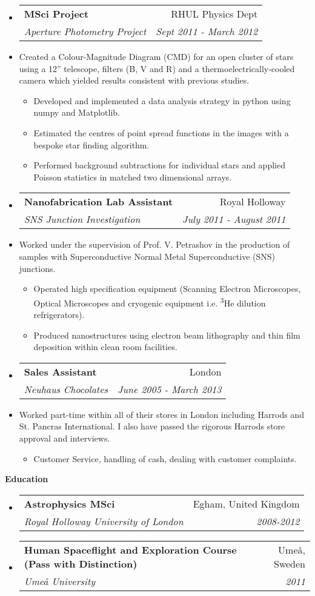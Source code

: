 \documentclass[letterpaper,11pt]{article}
\makeatletter
\newcommand{\resitem}[1]{\item #1 \vspace{-2pt}}
\newcommand{\resheading}[1]{{\large \colorbox{mygrey}
                            {\begin{minipage}{\textwidth}
                            {\textbf{#1 \vphantom{p\^{E}}}}
                            \end{minipage}}}
}
\newcommand{\ressubheading}[4]{
                \begin{tabular*}{180mm}{l@{\extracolsep{\fill}}r}
                \textbf{#1} & #2 \\
                \textit{#3} & \textit{#4} \\
                \end{tabular*}\vspace{-6pt}
}
\newcommand{\resdescription}[1]{#1 \vspace{-0mm}}
\makeatother
\begin{document}
\begin{itemize}
  \item[]
  \ressubheading{MSci Project}{RHUL Physics Dept}{Aperture Photometry Project}{Sept 2011 - March 2012}
  \item[]
    \resdescription{Created a Colour-Magnitude Diagram (CMD) for an open cluster of stars using a 12'' telescope, filters (B, V and R) and a thermoelectrically-cooled camera which yielded results consistent with previous studies.}
    \begin{itemize}
      \resitem{Developed and implemented a data analysis strategy in python using numpy and Matplotlib.}
      \resitem{Estimated the centres of point spread functions in the images with a bespoke star finding algorithm.}
      \resitem{Performed background subtractions for individual stars and applied Poisson statistics in matched two dimensional arrays.}
    \end{itemize}

  \item[]
  \ressubheading{Nanofabrication Lab Assistant}{Royal Holloway}{SNS Junction Investigation}{July 2011 - August 2011}
  \item[]
     \resdescription{Worked under the supervision of Prof. V. Petrashov in the production of samples with Superconductive Normal Metal Superconductive (SNS) junctions.}
     \begin{itemize}
       \resitem{Operated high specification equipment (Scanning Electron Microscopes, Optical Microscopes and cryogenic equipment i.e. \textsuperscript{3}He dilution refrigerators).}
       \resitem{Produced nanostructures using electron beam lithography and thin film deposition within clean room facilities.}
     \end{itemize}

  \item[]
  \ressubheading{Sales Assistant}{London}{Neuhaus Chocolates}{June 2005 - March 2013}
  \item[]
    \resdescription{Worked part-time within all of their stores in London including Harrods and St. Pancras International. I also have passed the rigorous Harrods store approval and interviews.}
    \begin{itemize}
      \resitem{Customer Service, handling of cash, dealing with customer complaints.}
    \end{itemize}

\end{itemize}

\resheading{Education}
\begin{itemize}
  \item[]
      \ressubheading{Astrophysics MSci }{Egham, United Kingdom}{Royal Holloway University of London}{2008-2012}

  \item[]
    \ressubheading{Human Spaceflight and Exploration Course (Pass with Distinction)}{Ume\r{a}, Sweden}{Ume\r{a} University}{2011}

\end{itemize}
\end{document}
